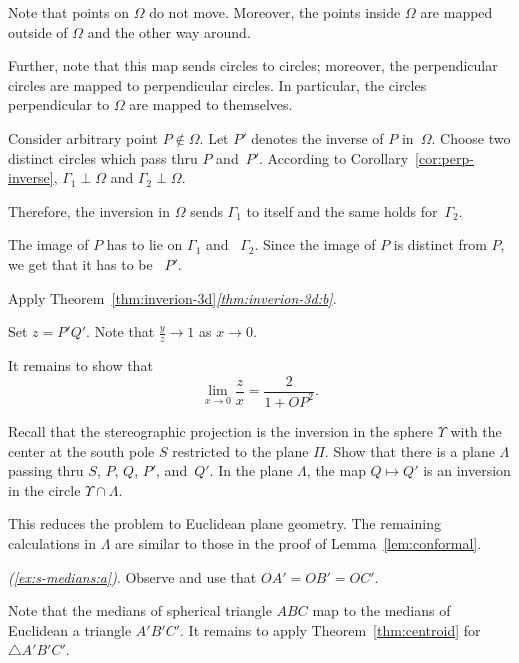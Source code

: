 Note that points on $\Omega$ do not move.
Moreover, the points inside $\Omega$ 
are mapped outside of $\Omega$ and the other way around.

Further, note that this map sends circles to circles;
moreover, the perpendicular circles are mapped to perpendicular circles.
In particular, the circles perpendicular to $\Omega$ are mapped to themselves.

Consider arbitrary point $P\notin\Omega$.
Let $P'$ denotes the inverse of $P$ in~$\Omega$.
Choose two distinct circles which pass thru $P$ and~$P'$.
According to Corollary~\ref{cor:perp-inverse}, 
$\Gamma_1\perp \Omega$ and $\Gamma_2\perp \Omega$.

Therefore, the inversion in $\Omega$ sends $\Gamma_1$ to itself and the same holds for~$\Gamma_2$. 

The image of $P$ has to lie on $\Gamma_1$ and ~$\Gamma_2$.
Since the image of $P$ is distinct from $P$, we get that it has to be ~$P'$.

Apply Theorem~\ref{thm:inverion-3d}\textit{\ref{thm:inverion-3d:b}}.

Set $z=P'Q'$.
Note that $\tfrac yz\to 1$ as $x\to 0$.

It remains to show that 
$$\lim_{x\to 0} \frac{z}{x}=\frac{2}{1+OP^2}.$$

Recall that the stereographic projection is the inversion in the sphere $\Upsilon$ with the center at the south pole $S$ restricted to the plane $\Pi$.
Show that there is a plane $\Lambda$ passing thru $S$, $P$, $Q$, $P'$, and~$Q'$.
In the plane $\Lambda$, the map $Q\mapsto Q'$ is an inversion in the circle $\Upsilon\cap \Lambda$.

This reduces the problem to Euclidean plane geometry.
The remaining calculations in $\Lambda$ are similar to those in the proof of Lemma~\ref{lem:conformal}.

\textit{(\ref{ex:s-medians:a})}.
Observe and use that 
$OA'=OB'=OC'$.

 Note that the medians of spherical triangle $ABC$ 
map to the medians of Euclidean a triangle $A'B'C'$.
It remains to apply Theorem~\ref{thm:centroid} for $\triangle A'B'C'$.

\setcounter{eqtn}{0}


